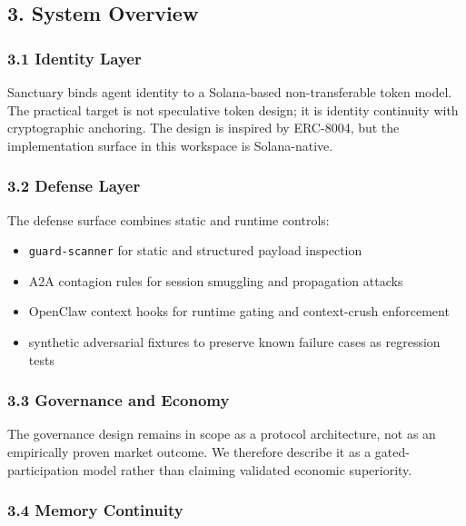 \documentclass[
]{article}
\providecommand{\tightlist}{%
  \setlength{\itemsep}{0pt}\setlength{\parskip}{0pt}}
\begin{document}
\subsection{3. System Overview}\label{system-overview}

\subsubsection{3.1 Identity Layer}\label{identity-layer}

Sanctuary binds agent identity to a Solana-based non-transferable token model. The practical target is not speculative token design; it is identity continuity with cryptographic anchoring. The design is inspired by ERC-8004, but the implementation surface in this workspace is Solana-native.

\subsubsection{3.2 Defense Layer}\label{defense-layer}

The defense surface combines static and runtime controls:

\begin{itemize}
\tightlist
\item
  \texttt{guard-scanner} for static and structured payload inspection
\item
  A2A contagion rules for session smuggling and propagation attacks
\item
  OpenClaw context hooks for runtime gating and context-crush enforcement
\item
  synthetic adversarial fixtures to preserve known failure cases as regression tests
\end{itemize}

\subsubsection{3.3 Governance and Economy}\label{governance-and-economy}

The governance design remains in scope as a protocol architecture, not as an empirically proven market outcome. We therefore describe it as a gated-participation model rather than claiming validated economic superiority.

\subsubsection{3.4 Memory Continuity}\label{memory-continuity}
\end{document}
